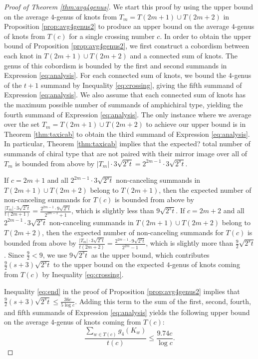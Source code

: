 \documentclass[12pt]{amsart}
\theoremstyle{definition}
\theoremstyle{remark}
\numberwithin{equation}{section}
\def\blue{\color{blue}}
\begin{document}
\begin{proof}[Proof of Theorem \ref{thm:avg4genus}]
We start this proof by using the upper bound on the average $4$-genus of knots from $T_m=T(2m+1)\cup T(2m+2)$ in Proposition \ref{prop:avg4genus2} to produce an upper bound on the average $4$-genus of knots from $T(c)$ for a single crossing number $c$. In order to obtain the upper bound of Proposition \ref{prop:avg4genus2}, we first construct a cobordism between each knot in $T(2m+1)\cup T(2m+2)$ and a connected sum of knots. The genus of this cobordism is bounded by the first and second summands in Expression \eqref{eq:analysis}. For each connected sum of knots, we bound the $4$-genus of the $t+1$ summand by Inequality \eqref{eq:crossing}, giving the fifth summand of Expression \eqref{eq:analysis}. We also assume that each connected sum of knots has the  maximum possible number of summands of amphichiral type, yielding the fourth summand of Expression \eqref{eq:analysis}. The only instance where we average over the set $T_m=T(2m+1)\cup T(2m+2)$ to achieve our upper bound is in Theorem \ref{thm:taxicab} to obtain the third summand of Expression \eqref{eq:analysis}. In particular, Theorem \ref{thm:taxicab} implies that the {\blue expected?} total number of summands of chiral type that are not paired with their mirror image over all of $T_m$ is bounded from above by $|T_m|\cdot 3\sqrt{2^s t}=2^{2m-1}\cdot 3\sqrt{2^s t}$.

If $c=2m+1$ and all $2^{2m-1}\cdot 3\sqrt{2^s t}$ non-canceling summands in $T(2m+1)\cup T(2m+2)$ belong to $T(2m+1)$, then the expected number of non-canceling summands for $T(c)$ is bounded from above by $\frac{|T_m|\cdot 3\sqrt{2^s t}}{t(2m+1)}=\frac{2^{2m-1}\cdot 9\sqrt{2^s t}}{2^{2m-1}+1}$, which is slightly less than $9\sqrt{2^s t}$. If $c=2m+2$ and all $2^{2m-1}\cdot 3\sqrt{2^s t}$ non-canceling summands in $T(2m+1)\cup T(2m+2)$ belong to $T(2m+2)$, then the expected number of non-canceling summands for $T(c)$ is bounded from above by $\frac{|T_m|\cdot 3\sqrt{2^s t}}{t(2m+2)}=\frac{2^{2m-1}\cdot 9\sqrt{2^s t}}{2^{2m}-1}$, which is slightly more than $\frac{9}{2}\sqrt{2^s t}$. Since $\frac{9}{2} < 9$, we use $9\sqrt{2^s t}$ as the upper bound, which contributes $\frac{9}{2}(s+3)\sqrt{2^s t}$ to the upper bound on the expected $4$-genus of knots coming from $T(c)$ by Inequality \ref{eq:crossing}.


Inequality \eqref{eq:end} in the proof of Proposition \ref{prop:avg4genus2} implies that $\frac{9}{2}(s+3)\sqrt{2^s t} \leq \frac{36c}{5\log c}$. Adding this term to the sum of the first, second, fourth, and fifth summands of Expression \eqref{eq:analysis} yields the following upper bound on the average $4$-genus of knots coming from $T(c)$:
\begin{equation}
\label{eq:tcbound}
    \frac{\sum_{w\in T(c)}g_4(K_w)}{t(c)} \leq \frac{9.74c}{\log c}.
\end{equation}


\end{proof}
\end{document}

